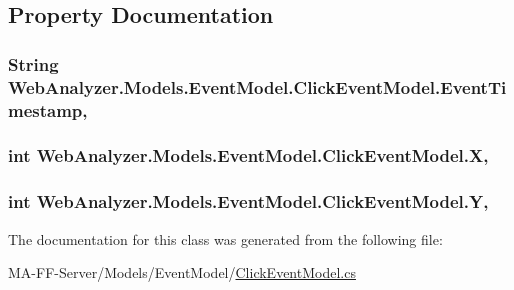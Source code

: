 \subsection{Property Documentation}
\hypertarget{class_web_analyzer_1_1_models_1_1_event_model_1_1_click_event_model_aa41e2fba46ac94e35b54c5129506aa24}{}
\subsubsection[{Event\+Timestamp}]{\setlength{\rightskip}{0pt plus 5cm}String Web\+Analyzer.\+Models.\+Event\+Model.\+Click\+Event\+Model.\+Event\+Timestamp\hspace{0.3cm}{\ttfamily [get]}, {\ttfamily [set]}}\label{class_web_analyzer_1_1_models_1_1_event_model_1_1_click_event_model_aa41e2fba46ac94e35b54c5129506aa24}
\hypertarget{class_web_analyzer_1_1_models_1_1_event_model_1_1_click_event_model_a6d3d1e265eda3d709b09df33b60188f1}{}
\subsubsection[{X}]{\setlength{\rightskip}{0pt plus 5cm}int Web\+Analyzer.\+Models.\+Event\+Model.\+Click\+Event\+Model.\+X\hspace{0.3cm}{\ttfamily [get]}, {\ttfamily [set]}}\label{class_web_analyzer_1_1_models_1_1_event_model_1_1_click_event_model_a6d3d1e265eda3d709b09df33b60188f1}
\hypertarget{class_web_analyzer_1_1_models_1_1_event_model_1_1_click_event_model_a304a5fe726ae3cfc26cc7659315ca7eb}{}
\subsubsection[{Y}]{\setlength{\rightskip}{0pt plus 5cm}int Web\+Analyzer.\+Models.\+Event\+Model.\+Click\+Event\+Model.\+Y\hspace{0.3cm}{\ttfamily [get]}, {\ttfamily [set]}}\label{class_web_analyzer_1_1_models_1_1_event_model_1_1_click_event_model_a304a5fe726ae3cfc26cc7659315ca7eb}


The documentation for this class was generated from the following file\+:\begin{DoxyCompactItemize}
\item 
M\+A-\/\+F\+F-\/\+Server/\+Models/\+Event\+Model/\hyperlink{_click_event_model_8cs}{Click\+Event\+Model.\+cs}\end{DoxyCompactItemize}
